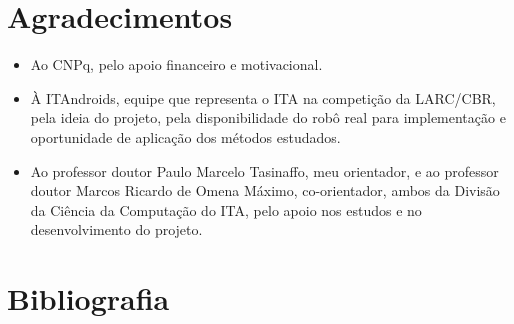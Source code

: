 \documentclass[a4paper,12pt]{article}
\begin{document}
\section{Agradecimentos}

\begin{itemize}
\item Ao CNPq, pelo apoio financeiro e motivacional.
\item À ITAndroids, equipe que representa o ITA na competição da LARC/CBR, pela ideia do projeto, pela disponibilidade do robô real para implementação e oportunidade de aplicação dos métodos estudados.
\item Ao professor doutor Paulo Marcelo Tasinaffo, meu orientador, e ao professor doutor Marcos Ricardo de Omena Máximo, co-orientador, ambos da Divisão da Ciência da Computação do ITA, pelo apoio nos estudos e no desenvolvimento do projeto.

\end{itemize}

\section{Bibliografia}

\printbibliography
\end{document}
